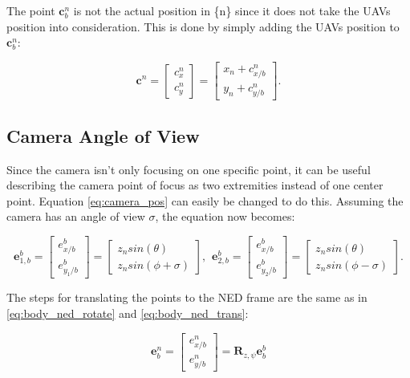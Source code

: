 The point $\bm{c}_b^n$ is not the actual position in \{n\} since it does not take the UAVs position into consideration. This is done by simply adding the UAVs position to $\bm{c}_b^n$:

\begin{equation} \label{eq:body_ned_trans}
	\bm{c}^n =
	\begin{bmatrix}
		c_x^n \\ c_y^n
	\end{bmatrix}
	=
	\begin{bmatrix}
		x_n + c_{x/b}^n \\
		y_n + c_{y/b}^n
	\end{bmatrix}.
\end{equation}

\subsection{Camera Angle of View}
Since the camera isn't only focusing on one specific point, it can be useful describing the camera point of focus as two extremities instead of one center point. Equation \eqref{eq:camera_pos} can easily be changed to do this. Assuming the camera has an angle of view $\sigma$, the equation now becomes:

\begin{equation}
	\bm{e}_{1,b}^b = 
	\begin{bmatrix}
		e^b_{x/b} \\ e^b_{y_1/b}
	\end{bmatrix}
	=
	\begin{bmatrix}
		z_n sin(\theta)\\
		z_n sin(\phi + \sigma)
	\end{bmatrix}
	, \hspace{5pt}
	\bm{e}_{2,b}^b = 
	\begin{bmatrix}
		e^b_{x/b} \\ e^b_{y_2/b}
	\end{bmatrix}
	=
	\begin{bmatrix}
		z_n sin(\theta)\\
		z_n sin(\phi - \sigma)
	\end{bmatrix}.
\end{equation}

The steps for translating the points to the NED frame are the same as in \eqref{eq:body_ned_rotate} and \eqref{eq:body_ned_trans}:

\begin{equation}
	\bm{e}_b^n =
	\begin{bmatrix}
		e^n_{x/b} \\ e^n_{y/b}
	\end{bmatrix}
	= \bm{R}_{z,\psi} \bm{e}_b^b
\end{equation}

